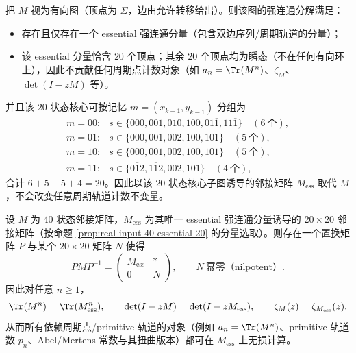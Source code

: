 \begin{proposition}\label{prop:real-input-40-essential-20}
把 $M$ 视为有向图（顶点为 $\Sigma$，边由允许转移给出）。则该图的强连通分解满足：
\begin{itemize}
  \item 存在且仅存在一个 essential 强连通分量（包含双边序列/周期轨道的分量）；
  \item 该 essential 分量恰含 $20$ 个顶点；其余 $20$ 个顶点均为瞬态（不在任何有向环上），因此不贡献任何周期点计数对象（如 $a_n=\Tr(M^n)$、$\zeta_M$、$\det(I-zM)$ 等）。
\end{itemize}
并且该 $20$ 状态核心可按记忆 $m=(x_{k-1},y_{k-1})$ 分组为
\[
\begin{array}{ll}
m=00:& s\in\{000,001,010,100,01\overline{1},11\overline{1}\}\quad(6\ \text{个}),\\
m=01:& s\in\{000,001,002,100,101\}\quad(5\ \text{个}),\\
m=10:& s\in\{000,001,002,100,101\}\quad(5\ \text{个}),\\
m=11:& s\in\{0\overline{1}2,1\overline{1}2,002,101\}\quad(4\ \text{个}),
\end{array}
\]
合计 $6+5+5+4=20$。因此以该 $20$ 状态核心子图诱导的邻接矩阵 $M_{\mathrm{ess}}$ 取代 $M$，不会改变任意周期轨道计数不变量。
\end{proposition}

\begin{proposition}\label{prop:real-input-40-essential-reduction}
设 $M$ 为 40 状态邻接矩阵，$M_{\mathrm{ess}}$ 为其唯一 essential 强连通分量诱导的 $20\times 20$ 邻接矩阵（按命题 \ref{prop:real-input-40-essential-20} 的分量选取）。则存在一个置换矩阵 $P$ 与某个 $20\times 20$ 矩阵 $N$ 使得
\[
PMP^{-1}=
\begin{pmatrix}
M_{\mathrm{ess}} & *\\
0 & N
\end{pmatrix},
\qquad
N\ \text{幂零（nilpotent）}.
\]
因此对任意 $n\ge 1$，
\[
\Tr(M^n)=\Tr(M_{\mathrm{ess}}^n),
\qquad
\det(I-zM)=\det(I-zM_{\mathrm{ess}}),
\qquad
\zeta_M(z)=\zeta_{M_{\mathrm{ess}}}(z),
\]
从而所有依赖周期点/primitive 轨道的对象（例如 $a_n=\Tr(M^n)$、primitive 轨道数 $p_n$、Abel/Mertens 常数与其扭曲版本）都可在 $M_{\mathrm{ess}}$ 上无损计算。
\end{proposition}

